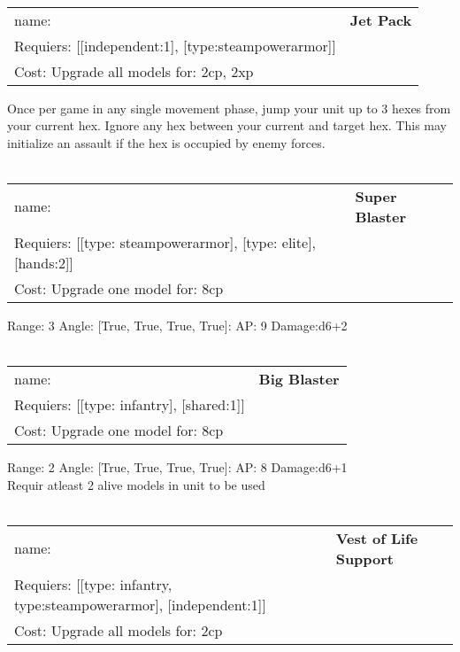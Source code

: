 \ \\
\begin{tabular}{ll}
name: & {\bf Jet Pack } \\
Requiers: [[independent:1], [type:steampowerarmor]] \\
Cost: Upgrade all models for: 2cp, 2xp \\
\end{tabular}

Once per game in any single movement phase, jump your unit up to 3 hexes from your current hex. Ignore any hex between your current and target hex. This may initialize an assault if the hex is occupied by enemy forces.\\ 









\ \\
\begin{tabular}{ll}
name: & {\bf Super Blaster } \\
Requiers: [[type: steampowerarmor], [type: elite], [hands:2]] \\
Cost: Upgrade one model for: 8cp \\
\end{tabular}



Range: 3  Angle: [True, True, True, True]: AP: 9 Damage:d6+2 \\








\ \\
\begin{tabular}{ll}
name: & {\bf Big Blaster } \\
Requiers: [[type: infantry], [shared:1]] \\
Cost: Upgrade one model for: 8cp \\
\end{tabular}



Range: 2  Angle: [True, True, True, True]: AP: 8 Damage:d6+1 \\
Requir atleast 2 alive models in unit to be used\\ 








\ \\
\begin{tabular}{ll}
name: & {\bf Vest of Life Support } \\
Requiers: [[type: infantry, type:steampowerarmor], [independent:1]] \\
Cost: Upgrade all models for: 2cp \\
\end{tabular}

